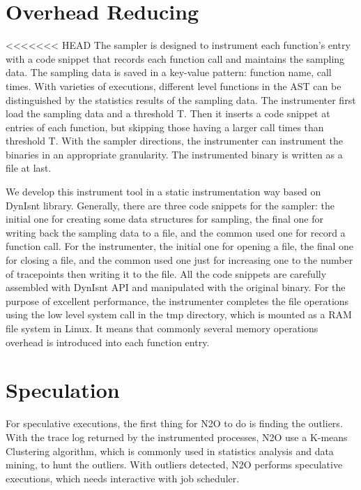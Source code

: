 \section{Overhead Reducing}

<<<<<<< HEAD
The sampler is designed to instrument each function’s entry with a code snippet that records each function call and maintains the sampling data. The sampling data is saved in a key-value pattern: function name, call times. With varieties of executions, different level functions in the AST can be distinguished by the statistics results of the sampling data. The instrumenter first load the sampling data and a threshold T. Then it inserts a code snippet at entries of each function, but skipping those having a larger call times than threshold T. With the sampler directions, the instrumenter can instrument the binaries in an appropriate granularity. The instrumented binary is written as a file at last.

We develop this instrument tool in a static instrumentation way based on DynIsnt library. Generally, there are three code snippets for the sampler: the initial one for creating some data structures for sampling, the final one for writing back the sampling data to a file, and the common used one for record a function call. For the instrumenter, the initial one for opening a file, the final one for closing a file, and the common used one just for increasing one to the number of tracepoints then writing it to the file. All the code snippets are carefully assembled with DynIsnt API and manipulated with the original binary. For the purpose of excellent performance, the instrumenter completes the file operations using the low level system call in the tmp directory, which is mounted as a RAM file system in Linux. It means that commonly several memory operations overhead is introduced into each function entry.

\section{Speculation}
For speculative executions, the first thing for N2O to do is finding the outliers. With the trace log returned by the instrumented processes, N2O use a K-means Clustering algorithm, which is commonly used in statistics analysis and data mining, to hunt the outliers. With outliers detected, N2O performs speculative executions, which needs interactive with job scheduler.

